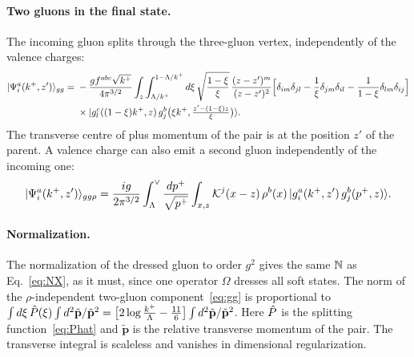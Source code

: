 \paragraph*{Two gluons in the final state.} The incoming gluon splits through the three-gluon vertex, independently of the valence charges:
\begin{align}
|\Psi^a_i(k^+,z')\rangle_{gg}={}&-\frac{gf^{abc}\sqrt{k^+}}{4\pi^{3/2}}\int_z\int_{\Lambda/k^+}^{1-\Lambda/k^+}d\xi\,\sqrt{\frac{1-\xi}{\xi}}\,\frac{(z-z')^m}{(z-z')^2}\Big[\delta_{im}\delta_{jl}-\frac1\xi\delta_{jm}\delta_{il}-\frac{1}{1-\xi}\delta_{lm}\delta_{ij}\Big]\notag\\
&\times|g^c_l((1-\xi)k^+,z)\,g^b_j\big(\xi k^+,\tfrac{z'-(1-\xi)z}{\xi}\big)\rangle .
\label{eq:gg}
\end{align}
The transverse centre of plus momentum of the pair is at the position $z'$ of the parent. A valence charge can also emit a second gluon independently of the incoming one:
\begin{equation}
|\Psi^a_i(k^+,z')\rangle_{gg\rho}=\frac{ig}{2\pi^{3/2}}\int_{\Lambda}^{\vee}\frac{dp^+}{\sqrt{p^+}}\int_{x,z}\mathcal{K}^j(x-z)\,\rho^b(x)\,|g^a_i(k^+,z')\,g^b_j(p^+,z)\rangle .
\label{eq:ggrho1}
\end{equation}

\paragraph*{Normalization.} The normalization of the dressed gluon to order $g^2$ gives the same $\mathbb{N}$ as Eq.~\eqref{eq:NX}, as it must, since one operator $\Omega$ dresses all soft states. The norm of the $\rho$-independent two-gluon component~\eqref{eq:gg} is proportional to $\int d\xi\,\hat P(\xi)\int d^2\tilde{\mathbf p}/\tilde{\mathbf p}^2=\big[2\log\frac{k^+}{\Lambda}-\frac{11}{6}\big]\int d^2\tilde{\mathbf p}/\tilde{\mathbf p}^2$. Here $\hat P$ is the splitting function~\eqref{eq:Phat} and $\tilde{\mathbf p}$ is the relative transverse momentum of the pair. The transverse integral is scaleless and vanishes in dimensional regularization.

